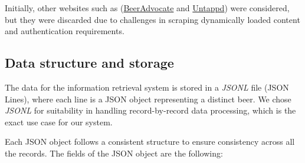 Initially, other websites such as (\href{https://www.beeradvocate.com/}{BeerAdvocate} and \href{https://untappd.com/}{Untappd}) were considered, but they were discarded due to challenges in scraping dynamically loaded content and authentication requirements.

\subsection{Data structure and storage}

The data for the information retrieval system is stored in a \textit{JSONL} file (JSON Lines), where each line is a JSON object representing a distinct beer. We chose \textit{JSONL} for suitability in handling record-by-record data processing, which is the exact use case for our system.

Each JSON object follows a consistent structure to ensure consistency across all the records. The fields of the JSON object are the following:

